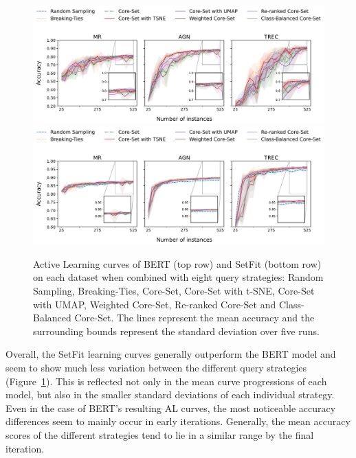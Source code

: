 \documentclass[english,bachelor,ul]{webisthesis} %
\begin{document}
\begin{figure}[t]
    \centering
    \includegraphics[width=1\textwidth,trim={0 1.1cm 0 0},clip]{img/bert-plots-1.png}
    \includegraphics[width=1\textwidth,trim={0 0 0 4.83cm},clip]{img/setfit-plots-1.png}
    \caption{Active Learning curves of BERT (top row) and SetFit (bottom row) on each dataset when combined with eight query strategies: Random Sampling, Breaking-Ties, Core-Set, Core-Set with t-SNE, Core-Set with UMAP, Weighted Core-Set, Re-ranked Core-Set and Class-Balanced Core-Set. The lines represent the mean accuracy and the surrounding bounds represent the standard deviation over five runs.}
    \label{fig:learning-curves}
\end{figure}

Overall, the SetFit learning curves generally outperform the BERT model and seem to show much less variation between the different query strategies (Figure~\ref{fig:learning-curves}). This is reflected not only in the mean curve progressions of each model, but also in the smaller standard deviations of each individual strategy. Even in the case of BERT's resulting AL curves, the most noticeable accuracy differences seem to mainly occur in early iterations. Generally, the mean accuracy scores of the different strategies tend to lie in a similar range by the final iteration. 
\end{document}

